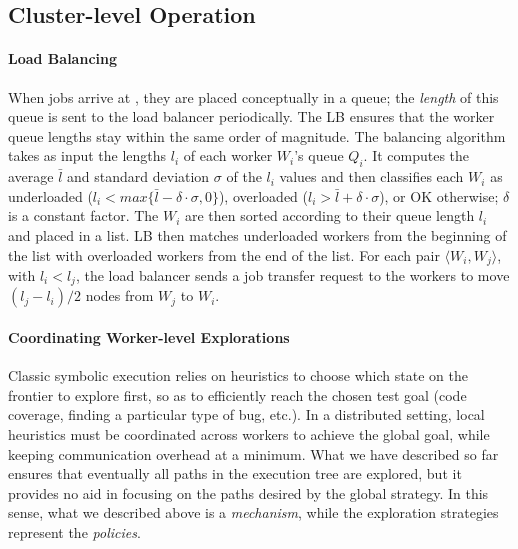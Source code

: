 
\subsection{Cluster-level Operation}
\label{sec:loadBalancing}

\paragraph{Load Balancing}

When jobs arrive at \wdst, they are placed conceptually in a queue; the \emph{length} of this queue is sent to the load balancer periodically.  The LB ensures that the worker queue lengths stay within the same order of magnitude.  The balancing algorithm takes as input the lengths $l_i$ of each worker $W_i$'s queue $Q_i$.  It computes the average $\bar{l}$ and standard deviation $\sigma$ of the $l_i$ values and then classifies each $W_i$ as underloaded ($l_i < max \{ \bar{l}-\delta \cdot \sigma, 0 \}$), overloaded ($l_i > \bar{l} + \delta \cdot \sigma$), or OK otherwise; $\delta$ is a constant factor.  The $W_i$ are then sorted according to their queue length $l_i$ and placed in a list.  LB then matches underloaded workers from the beginning of the list with overloaded workers from the end of the list.  For each pair $\langle W_i,W_j \rangle$, with $l_i < l_j$, the load balancer sends a job transfer request to the workers to  move $(l_j - l_i)/2$ \candidate nodes from $W_j$ to $W_i$.


\paragraph{Coordinating Worker-level Explorations}
\label{sec:globalStrategy}

Classic symbolic execution relies on heuristics to choose which state on the frontier to explore first, so as to efficiently reach the chosen test goal (code coverage, finding a particular type of bug, etc.). In a distributed setting, local heuristics must be coordinated across workers to achieve the global goal, while keeping communication overhead at a minimum. What we have described so far ensures that eventually all paths in the execution tree are explored, but it provides no aid in focusing on the paths desired by the global strategy.  In this sense, what we described above is a \emph{mechanism}, while the exploration strategies represent the \emph{policies}.

